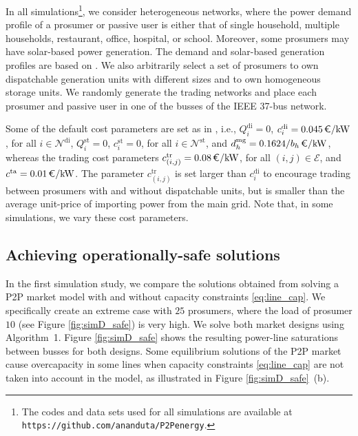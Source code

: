\documentclass{IEEEtran}  %
\newcommand{\mc}{\mathcal}
\newcommand{\0}{\mathbf{0}}
\newcommand{\1}{\mathbf{1}}
\begin{document}
In all simulations\footnote{The codes and data sets used for all simulations are available at \texttt{https://github.com/ananduta/P2Penergy}.}, we consider heterogeneous networks, where the power demand profile of a prosumer or passive user is either that of single household, multiple households, restaurant, office, hospital, or school. Moreover, some prosumers may have solar-based power generation. The demand and solar-based generation profiles are based on \cite{jasm}.
%
We also arbitrarily select a set of prosumers to own dispatchable generation units with different sizes and to own homogeneous storage units. We randomly generate the trading networks and place each prosumer and passive user in one of the busses of the IEEE 37-bus network. 

Some of the default cost parameters are set as in \cite{atzeni2013}, i.e., $Q_i^{\mathrm{di}}=0$, $c_i^{\mathrm{di}}=0.045\,  \text{\euro/kW}$, for all $i \in \mc N^{\mathrm{di}}$, $Q_i^{\mathrm{st}}=0$, $c_i^{\mathrm{st}}=0$, for all $i \in \mc N^{\mathrm{st}}$, and $d_h^{\mathrm{mg}}=0.1624/b_h \, \text{\euro/kW}$, whereas the trading cost parameters $c_{(i,j)}^{\mathrm{tr}}=0.08 \,  \text{\euro/kW}$, for all $(i,j) \in \mc E$, and $c^{\mathrm{ta}}=0.01 \,  \text{\euro/kW}$. The parameter $c_{(i,j)}^{\mathrm{tr}}$ is set larger than $c_i^{\mathrm{di}}$ to encourage trading between prosumers with and without dispatchable units, but is smaller than the average unit-price of importing power from the main grid. Note that, in some simulations, we vary these cost parameters. 
%
%
\subsection{Achieving operationally-safe solutions}
In the first simulation study, we compare the solutions obtained from solving a P2P market model with and without capacity constraints \eqref{eq:line_cap}. We specifically create an extreme case with $25$ prosumers, where the load of  prosumer $10$ (see Figure \ref{fig:simD_safe}) is very high. We solve both market designs using Algorithm~1. Figure \ref{fig:simD_safe} shows the resulting power-line saturations between busses for both designs. 
%
Some equilibrium solutions of the P2P market cause overcapacity in some lines when capacity constraints \eqref{eq:line_cap} are not taken into account in the model, as illustrated in Figure \ref{fig:simD_safe}~(b).
\end{document}
